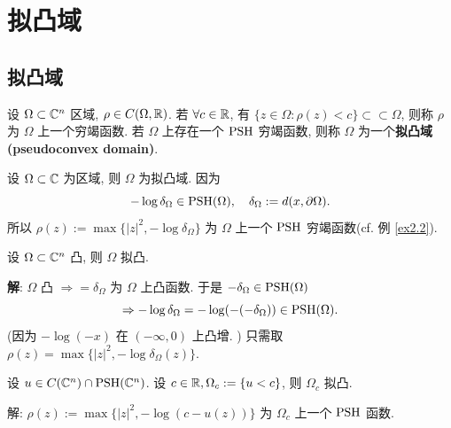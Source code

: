 \chapter{拟凸域}

\section{拟凸域}
\begin{definition}
    设 $\Omega \subset {\mathbb C}^n$ 区域, $\rho \in C(\Omega ,{\mathbb R})$. 若 $\forall c \in {\mathbb R}$, 有 $\{z \in \Omega :\rho (z)<c\} \subset \subset \Omega $, 则称 $\rho $ 为 $\Omega $ 上一个穷竭函数. 
    若 $\Omega $ 上存在一个 $\operatorname{PSH}$ 穷竭函数, 则称 $\Omega $ 为一个\textbf{拟凸域(pseudoconvex domain)}.        
\end{definition}

\begin{example}
    设 $\Omega \subset {\mathbb C}$ 为区域, 则 $\Omega $ 为拟凸域. 因为 
    $$ -\log \delta _{\Omega } \in \operatorname{PSH} (\Omega ), \quad \delta _{\Omega }:=d(x,\partial \Omega ). $$
    所以 $\rho (z):=\max\{|z|^2,-\log \delta _{\Omega }\}$ 为 $\Omega $ 上一个 $\operatorname{PSH}$  穷竭函数(cf. 例 \ref{ex2.2}).    
\end{example}

\begin{example}
    设 $\Omega \subset {\mathbb C}^n$ 凸, 则 $\Omega $ 拟凸.  

    \noindent\textbf{解}: $\Omega $ 凸 $\Rightarrow =\delta _{\Omega }$ 为 $\Omega $ 上凸函数. 
    于是 $-\delta _{\Omega } \in \operatorname{PSH}(\Omega )$ $$\Rightarrow -\log \delta _{\Omega }=-\log(-(-\delta _{\Omega })) \in \operatorname{PSH}(\Omega ).$$ (因为 $-\log(-x)$ 在 $(-\infty ,0)$ 上凸增. )      
    只需取 $\rho (z)=\max\{|z|^2,-\log \delta _{\Omega }(z)\}$. 
\end{example}

\begin{example}
    设 $u \in C({\mathbb C}^n)\cap \operatorname{PSH}({\mathbb C}^n)$. 设 $c \in {\mathbb R}, \Omega _c:=\{u<c\}$, 则 $\Omega _c$ 拟凸.
    
    \noindent 解: $\rho (z):=\max \{|z|^2,-\log(c-u(z))\}$ 为 $\Omega_c $ 上一个 $\operatorname{PSH}$ 函数.   
\end{example}

